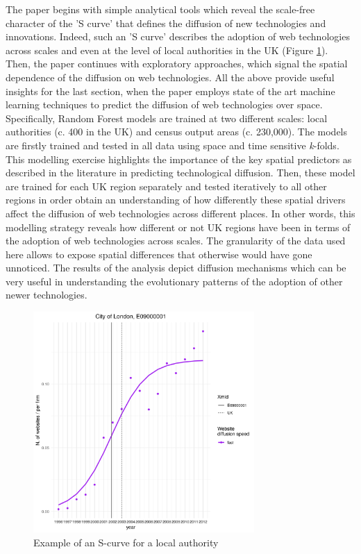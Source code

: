 \documentclass[11pt]{article}
\begin{document}
The paper begins with simple analytical tools which reveal the scale-free character of the 'S curve' that defines the diffusion of new technologies and innovations. Indeed, such an 'S curve' describes the adoption of web technologies across scales and even at the level of local authorities in the UK (Figure \ref{fig:s}). Then, the paper continues with exploratory approaches, which signal the spatial dependence of the diffusion on web technologies. All the above provide useful insights for the last section, when the paper employs state of the art machine learning techniques to predict the diffusion of web technologies over space. Specifically, Random Forest models are trained at two different scales: local authorities (c. 400 in the UK) and census output areas (c. 230,000). The models are firstly trained and tested in all data using space and time sensitive \emph{k}-folds. This modelling exercise highlights the importance of the key spatial predictors as described in the literature in predicting technological diffusion. Then, these model are trained for each UK region separately and tested iteratively to all other regions in order obtain an understanding of how differently these spatial drivers affect the diffusion of web technologies across different places. In other words, this modelling strategy reveals how different or not UK regions have been in terms of the adoption of web technologies across scales. The granularity of the data used here allows to expose spatial differences that otherwise would have gone unnoticed. The results of the analysis depict diffusion mechanisms which can be very useful in understanding the evolutionary patterns of the adoption of other newer technologies.

\begin{figure}[h]
    \centering
    \includegraphics[width=0.75\textwidth]{lad_E09000001}
    \caption{Example of an S-curve for a local authority}
    \label{fig:s}
\end{figure}


%
\end{document}
